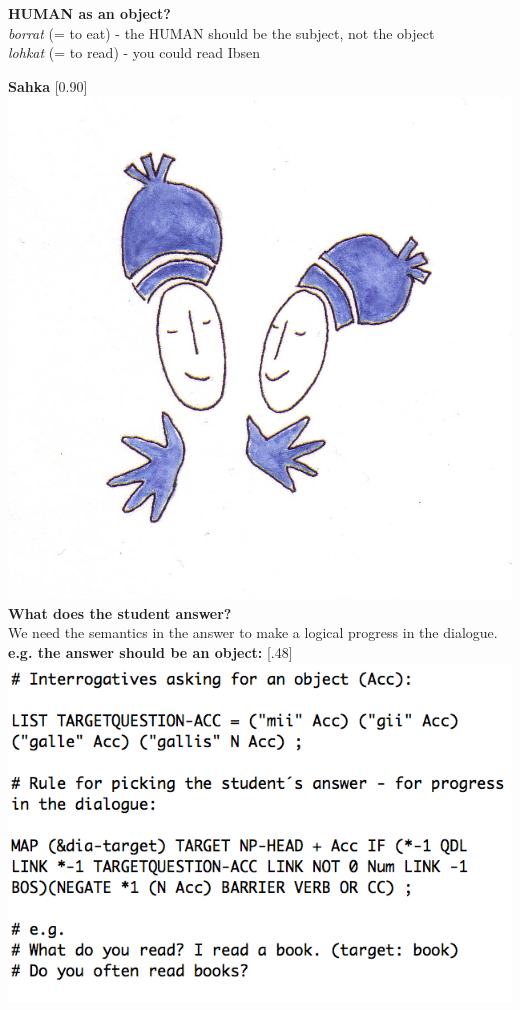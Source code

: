 \documentclass[landscape,norsk,11pt]{seminar}
\begin{document}
\begin{slide}
\newslide
\textbf{HUMAN as an object?} \\
 \textit{borrat} (= to eat) - the HUMAN should be the subject, not the object \\
  \textit{lohkat} (= to read) - you could read Ibsen

\newslide
\textbf{Sahka}
\scalebox{0.90}[0.90]{\includegraphics{img/sahka.png}} \\

\newslide
\textbf{What does the student answer?}\\
We need the semantics in the answer to make a logical progress in the dialogue. \\
\newslide
\textbf{e.g. the answer should be an object:}
\scalebox{.48}[.48]{\includegraphics{img/pickingObject.png}}



\end{slide}
\end{document}
